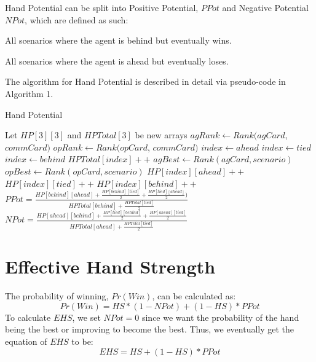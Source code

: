 \documentclass{article}
\begin{document}
Hand Potential can be split into Positive Potential, $PPot$ and Negative Potential $NPot$, which are defined as such:
\begin{description}[style=multiline,leftmargin=10mm]
\item [\emph{PPot}]All scenarios where the agent is behind but eventually wins.
\item [\emph{NPot}]All scenarios where the agent is ahead but eventually loses.
\end{description}

The algorithm for Hand Potential is described in detail via pseudo-code in Algorithm 1.

  \begin{algorithm}
   \caption{Hand Potential}
    \begin{algorithmic}[1]
        \State Let $HP[3][3]$ and $HPTotal[3]$ be new arrays
        \State $agRank \leftarrow Rank(agCard$, $commCard)$
            \State $opRank \leftarrow Rank(opCard$, $commCard)$
              \State $index \leftarrow ahead$
              \State $index \leftarrow tied$
            \Else
              \State $index \leftarrow behind$
            \EndIf
            \State $HPTotal[index]++$
              \State $agBest \leftarrow Rank(agCard, scenario)$
              \State $opBest \leftarrow Rank(opCard, scenario)$
                \State $HP[index][ahead]++$
                \State $HP[index][tied]++$
              \Else
                \State $HP[index][behind]++$
              \EndIf
            \EndFor
        \EndFor
        \State $PPot=\frac{HP[behind][ahead] + \frac{HP[behind][tied]}{2} +
  \frac{HP[tied][ahead]}{2})}{HPTotal[behind]+\frac{HPTotal[tied]}{2}}$
		\State $NPot = \frac{HP[ahead][behind] + \frac{HP[tied][behind]}{2} + \frac{HP[ahead][tied]}{2}}{HPTotal[ahead]+\frac{HPTotal[tied]}{2}}$
        \State{}
      \EndFunction
    \end{algorithmic}
  \end{algorithm}

\section{Effective Hand Strength}
The probability of winning, $Pr(Win)$, can be calculated as:
\begin{displaymath}
  Pr(Win) = HS * (1-NPot) + (1-HS) * PPot
\end{displaymath}
To calculate $EHS$, we set $NPot=0$ since we want the probability of the hand being the best or improving to become the best. Thus, we eventually get the equation of $EHS$ to be:
\begin{displaymath}
  EHS = HS +(1-HS) * PPot
\end{displaymath}
\end{document}
